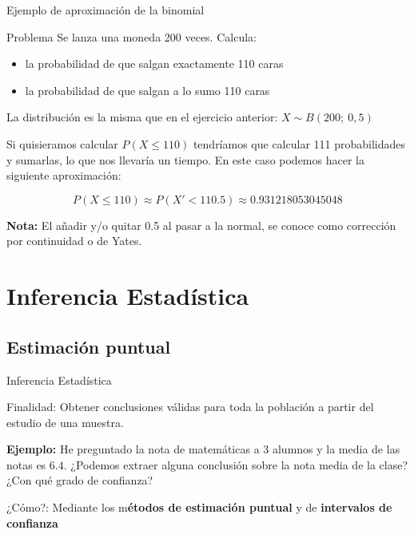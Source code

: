 \documentclass[11pt,handout]{beamer}
\begin{document}
\begin{frame}{Ejemplo de aproximación de la binomial}
\begin{block}{Problema}
Se lanza una moneda 200 veces. Calcula:
\begin{itemize}
\item la probabilidad de que salgan exactamente 110 caras
\item la probabilidad de que salgan a lo sumo 110 caras
\end{itemize} 

\end{block}

La distribución es la misma que en el ejercicio anterior: $X \sim B(200;\  0,5)$

Si quisieramos calcular $P(X \leq 110)$ tendríamos que calcular 111 probabilidades y sumarlas, lo que nos llevaría un tiempo. En este caso podemos hacer la siguiente aproximación:

$$\boxed{P(X\leq 110) \approx P(X' < 110.5)\approx 0.931218053045048}$$


\textbf{Nota:} El añadir y/o quitar 0.5 al pasar a la normal, se conoce como corrección por continuidad o de Yates.

\end{frame}

\section{Inferencia Estadística}
\subsection{Estimación puntual}
\begin{frame}{Inferencia Estadística}
\begin{block}{Finalidad:} Obtener conclusiones válidas para toda la población a partir del estudio de una muestra.
\end{block}

\textbf{Ejemplo:} He preguntado la nota de matemáticas a 3 alumnos y la media de las notas es $6.4$. ¿Podemos extraer alguna conclusión sobre la nota media de la clase?¿Con qué grado de confianza?

\pause

\begin{block}{¿Cómo?:} Mediante los m\textbf{étodos de estimación puntual} y de \textbf{intervalos de confianza}
\end{block}

\end{frame}
\end{document}
